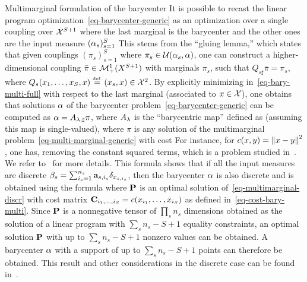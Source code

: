 \begin{rem2}{Multimarginal formulation of the barycenter}\label{eq-multimarg-bary}
	It is pos\-si\-ble to recast the linear program optimization~\eqref{eq-barycenter-generic} as an optimization over a single coupling over $\X^{S+1}$ where the last marginal is the barycenter and the other ones are the input measure $(\al_s)_{s=1}^S$
	This stems from the ``gluing lemma,'' which states that given couplings $(\pi_s)_{s=1}^S$ where $\pi_s \in \Couplings(\al_s,\al)$, one can construct a higher-dimensional coupling $\bar \pi \in \Mm_+^1(X^{S+1})$ with marginals $\pi_s$, \ie such that $Q_{s\sharp}\bar\pi=\pi_s$, where $Q_s(x_1,\ldots,x_S,x) \eqdef (x_s,x) \in \X^2$.
	By explicitly minimizing in~\eqref{eq-bary-multi-full} with respect to the last marginal (associated to $x \in \X$), one obtains that solutions $\al$ of the barycenter problem~\eqref{eq-barycenter-generic} can be computed as $\al = A_{\la,\sharp} \pi$, where $A_\la$ is the ``barycentric map'' defined as
	(assuming this map is single-valued), where $\pi$ is any solution of the multimarginal problem~\eqref{eq-multi-marginal-generic} with cost
	For instance, for $c(x,y)=\norm{x-y}^2$, one has, removing the constant squared terms, 
	which is a problem studied in~\citet{GangboSciech}.
	We refer to~\citet{Carlier_wasserstein_barycenter} for more details.
	This formula shows that if all the input measures are discrete $\be_s = \sum_{i_s=1}^{n_s} \a_{s,i_s} \de_{x_{s,i_s}}$, 
	then the barycenter $\al$ is also discrete and is obtained using the formula
	where $\P$ is an optimal solution of~\eqref{eq-multimarginal-discr} with cost matrix $\C_{i_1,\ldots,i_S} = c(x_{i_1},\ldots,x_{i_S})$
	as defined in~\eqref{eq-cost-bary-multi}. Since $\P$ is a nonnegative tensor of $\prod_s n_s$ dimensions obtained as the solution of a linear program with $\sum_s n_s-S+1$ equality constraints, an optimal solution $\P$ with up to $\sum_s n_s-S+1$ nonzero values can be obtained. A barycenter $\al$ with a support of up to $\sum_s n_s-S+1$ points can therefore be obtained. This result and other considerations in the discrete case can be found in~\citet{anderes2016discrete}.
\end{rem2}

